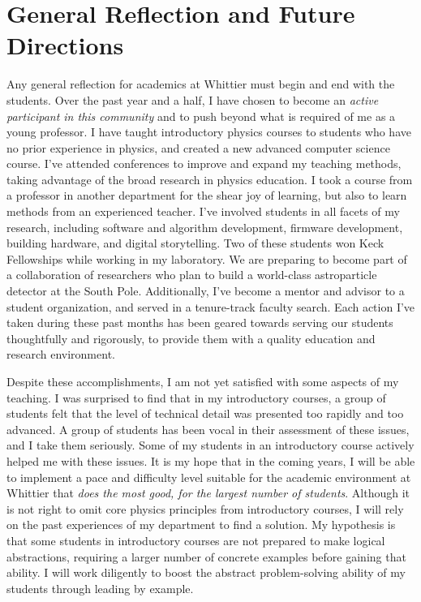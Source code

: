 \documentclass[../../main.tex]{subfiles}
\begin{document}
\section{General Reflection and Future Directions}

Any general reflection for academics at Whittier must begin and end with the students.  Over the past year and a half, I have chosen to become an \textit{active participant in this community} and to push beyond what is required of me as a young professor.  I have taught introductory physics courses to students who have no prior experience in physics, and created a new advanced computer science course.  I've attended conferences to improve and expand my teaching methods, taking advantage of the broad research in physics education.  I took a course from a professor in another department for the shear joy of learning, but also to learn methods from an experienced teacher.  I've involved students in all facets of my research, including software and algorithm development, firmware development, building hardware, and digital storytelling.  Two of these students won Keck Fellowships while working in my laboratory.  We are preparing to become part of a collaboration of researchers who plan to build a world-class astroparticle detector at the South Pole.  Additionally, I've become a mentor and advisor to a student organization, and served in a tenure-track faculty search.  Each action I've taken during these past months has been geared towards serving our students thoughtfully and rigorously, to provide them with a quality education and research environment. \\ \hspace{0.1cm}

Despite these accomplishments, I am not yet satisfied with some aspects of my teaching.  I was surprised to find that in my introductory courses, a group of students felt that the level of technical detail was presented too rapidly and too advanced.  A group of students has been vocal in their assessment of these issues, and I take them seriously.  Some of my students in an introductory course actively helped me with these issues.  It is my hope that in the coming years, I will be able to implement a pace and difficulty level suitable for the academic environment at Whittier that \textit{does the most good, for the largest number of students}.  Although it is not right to omit core physics principles from introductory courses, I will rely on the past experiences of my department to find a solution.  My hypothesis is that some students in introductory courses are not prepared to make logical abstractions, requiring a larger number of concrete examples before gaining that ability.  I will work diligently to boost the abstract problem-solving ability of my students through leading by example.
\end{document}
